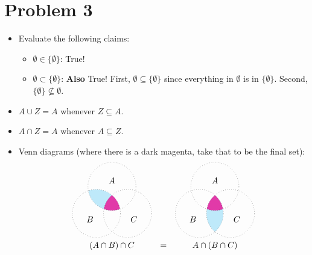 \section*{Problem 3}

\begin{itemize}
	\item Evaluate the following claims:
	\begin{itemize}
		\item $\emptyset \in \{\emptyset\}$: True!

		\item $\emptyset \subset \{\emptyset\}$: \textbf{Also} True! First, $\emptyset \subseteq \{\emptyset\}$ since everything in $\emptyset$ is in $\{\emptyset\}$. Second, $\{\emptyset\} \nsubseteq \emptyset$.%
	\end{itemize}

	\item $A \cup Z = A$ whenever $Z \subseteq A$.

	\item $A \cap Z = A$ whenever $A \subseteq Z$.

	\item Venn diagrams (where there is a dark magenta, take that to be the final set):%
	\[\begin{array}{ccc}
		\begin{tikzpicture}
			\begin{scope}
				\clip \firstcircle;
				\fill[cyan,opacity=.25] \secondcircle;
			\end{scope}
			\begin{scope}
				\clip \firstcircle;
				\clip \secondcircle;
				\fill[magenta,opacity=.75] \thirdcircle;
			\end{scope}
			\draw[dotted] \firstcircle node[text=black,above] {$A$};
			\draw[dotted] \secondcircle node [text=black,below left] {$B$};
			\draw[dotted] \thirdcircle node [text=black,below right] {$C$};
		\end{tikzpicture}
		&&
		\begin{tikzpicture}
			\begin{scope}
				\clip \secondcircle;
				\fill[cyan,opacity=.25] \thirdcircle;
			\end{scope}
			\begin{scope}
				\clip \firstcircle;
				\clip \secondcircle;
				\fill[magenta,opacity=.75] \thirdcircle;
			\end{scope}
			\draw[dotted] \firstcircle node[text=black,above] {$A$};
			\draw[dotted] \secondcircle node [text=black,below left] {$B$};
			\draw[dotted] \thirdcircle node [text=black,below right] {$C$};
		\end{tikzpicture}
		\\
		(A \cap B) \cap C
		&=&
		A \cap (B \cap C)
	\end{array}\]


\end{itemize}
